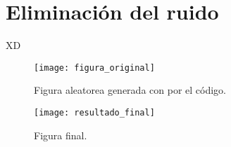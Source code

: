 




\setmainfont{AvenirLTStd-Roman}




\setmainfont{Calibri}


\MyIndex

\hypersetup{linkcolor=AzulInfo}

\newpage


\section{Eliminación del ruido}

XD

\begin{figure}[H]
	\centering
	\texttt{[image: figura\_original]}
	\caption{Figura aleatorea generada con por el código.}	
	\label{fig:original}
\end{figure}

\begin{figure}[H]
	\centering
	\texttt{[image: resultado\_final]}
	\caption{Figura final.}	
	\label{fig:final}
\end{figure}

